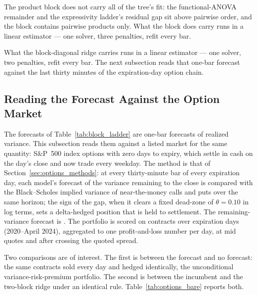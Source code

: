 The product block does not carry all of the tree's fit: the
functional-ANOVA remainder and the expressivity ladder's residual gap sit
above pairwise order, and the block contains pairwise products only. What
the block does carry runs in a linear estimator --- one solver, three
penalties, refit every bar.
\fi

What the block-diagonal ridge carries runs in a linear estimator --- one
solver, two penalties, refit every bar. The next subsection reads that
one-bar forecast against the last thirty minutes of the expiration-day
option chain.



\iffalse
\subsection{Reading the Forecast Against the Option Market}
\label{sec:spxw_econ}
\label{sec:options_results}

The forecasts of Table~\ref{tab:block_ladder} are one-bar forecasts of
realized variance. This subsection reads them against a listed market
for the same quantity: S\&P~500 index options with zero days to
expiry, which settle in cash on the day's close and now trade every
weekday. The method is that of Section~\ref{sec:options_methods}: at
every thirty-minute bar of every expiration day, each model's forecast
of the variance remaining to the close is compared with the
Black--Scholes implied variance of near-the-money calls and puts over
the same horizon; the sign of the gap, when it clears a fixed dead-zone
of $\theta = 0.10$ in log terms, sets a delta-hedged position that is
held to settlement. The remaining-variance forecast is
\optForecastMode{}. The portfolio is scored on \optNContracts{} contracts
over \optNDays{} expiration days (2020--April 2024), aggregated to one
profit-and-loss number per day, at mid quotes and after crossing the
quoted spread.

Two comparisons are of interest. The first is between the forecast
and no forecast: the same contracts sold every day and hedged
identically, the unconditional variance-risk-premium portfolio. The second
is between the incumbent and the two-block ridge under an identical
rule. Table~\ref{tab:options_bare} reports both.

